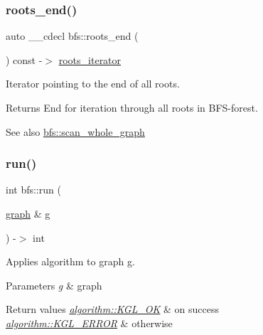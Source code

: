 \subsubsection{\texorpdfstring{roots\+\_\+end()}{roots\_end()}}
{\footnotesize\ttfamily auto \+\_\+\+\_\+cdecl bfs\+::roots\+\_\+end (\begin{DoxyParamCaption}{ }\end{DoxyParamCaption}) const -\/$>$ \mbox{\hyperlink{classbfs_a386ac6f3c63e38c3f5263e15c3ab9d01}{roots\+\_\+iterator}}
	\hspace{0.3cm}{\ttfamily [inline]}}



Iterator pointing to the end of all roots. 

\begin{DoxyReturn}{Returns}
End for iteration through all roots in B\+F\+S-\/forest. 
\end{DoxyReturn}
\begin{DoxySeeAlso}{See also}
\mbox{\hyperlink{classbfs_ac58d930764e6aa859fe706b1d916b9ad}{bfs\+::scan\+\_\+whole\+\_\+graph}} 
\end{DoxySeeAlso}
\mbox{\label{classbfs_aaeebfe1628febd8d4ba658efc0ef51ed}} 
\subsubsection{\texorpdfstring{run()}{run()}}
{\footnotesize\ttfamily int bfs\+::run (\begin{DoxyParamCaption}\item[{\mbox{\hyperlink{classgraph}{graph}} \&}]{g }\end{DoxyParamCaption}) -\/$>$  int\hspace{0.3cm}{\ttfamily [virtual]}}



Applies algorithm to graph g. 


\begin{DoxyParams}{Parameters}
{\em g} & graph \\
\hline
\end{DoxyParams}

\begin{DoxyRetVals}{Return values}
{\em \mbox{\hyperlink{classalgorithm_af1a0078e153aa99c24f9bdf0d97f6710aae4c1cd7fe8d8cf4b143241a6e7c31cf}{algorithm\+::\+K\+G\+L\+\_\+\+OK}}} & on success \\
\hline
{\em \mbox{\hyperlink{classalgorithm_af1a0078e153aa99c24f9bdf0d97f6710ae67bf27b2ef31f73e545a7f9f4a69556}{algorithm\+::\+K\+G\+L\+\_\+\+E\+R\+R\+OR}}} & otherwise \\
\hline
\end{DoxyRetVals}


